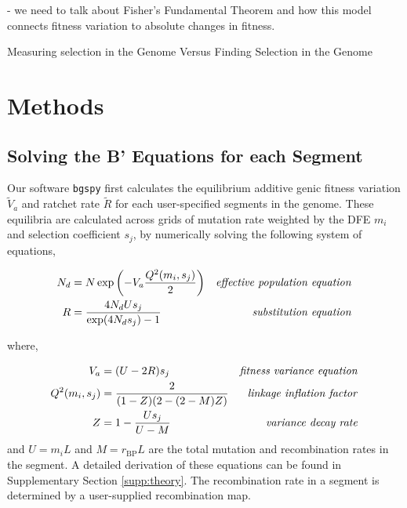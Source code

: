 \documentclass[11pt]{article}
\begin{document}
- we need to talk about Fisher's Fundamental Theorem and how this model
connects fitness variation to absolute changes in fitness.

Measuring selection in the Genome Versus Finding Selection in the Genome


\section*{Methods}

\subsection*{Solving the B' Equations for each Segment}
\label{sec:methods-bprime-eqns}

Our software \texttt{bgspy} first calculates the equilibrium additive genic
fitness variation $\widetilde{V}_a$ and ratchet rate $\widetilde{R}$ for each
user-specified segments in the genome. These equilibria are calculated across
grids of mutation rate weighted by the DFE $m_i$ and selection coefficient
$s_j$, by numerically solving the following system of equations,

\begin{align}
  \label{eq:}
  {N}_{d} &= N \exp \left( -V_a \frac{Q^2(m_i, s_j)}{2} \right) & \text{\emph{effective population equation}} \\
  R &= \frac{4N_dU s_j}{\exp(4 N_d s_j)-1}  & \text{\emph{substitution equation}} 
\end{align}

where,

\begin{align}
  V_a &= (U - 2 R) s_j & \text{\emph{fitness variance equation}} \\
  Q^2(m_i, s_j) &= \frac{2}{(1-Z)(2-(2-M)Z)} & \text{\emph{linkage inflation factor}} \\
  Z &= 1 - \frac{Us_j}{U-{M}} & \text{\emph{variance decay rate}}
\end{align}
%
and $U = m_i L$ and $M = r_\text{BP} L$ are the total mutation and
recombination rates in the segment. A detailed derivation of these equations
can be found in Supplementary Section \ref{supp:theory}. The recombination
rate in a segment is determined by a user-supplied recombination map.
\end{document}
